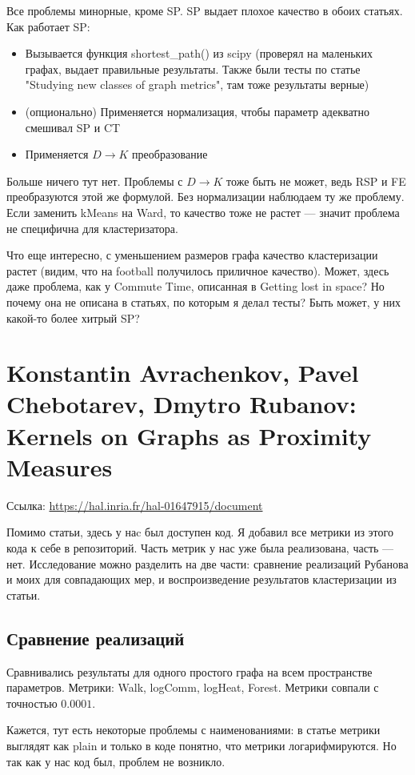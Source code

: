 \documentclass{article}
\begin{document}
Все проблемы минорные, кроме SP. SP выдает плохое качество в обоих статьях.
Как работает SP:
\begin{itemize}
  \item Вызывается функция shortest\_path() из scipy (проверял на маленьких графах, выдает правильные результаты. Также были тесты по статье "Studying new classes of graph metrics", там тоже результаты верные)
  \item (опционально) Применяется нормализация, чтобы параметр адекватно смешивал SP и CT
  \item Применяется $D \rightarrow K$ преобразование
\end{itemize}

Больше ничего тут нет. Проблемы с $D \rightarrow K$ тоже быть не может, ведь RSP и FE преобразуются этой же формулой. Без нормализации наблюдаем ту же проблему. Если заменить kMeans на Ward, то качество тоже не растет --- значит проблема не специфична для кластеризатора.

 Что еще интересно, с уменьшением размеров графа качество кластеризации растет (видим, что на football получилось приличное качество). Может, здесь даже проблема, как у Commute Time, описанная в Getting lost in space? Но почему она не описана в статьях, по которым я делал тесты? Быть может, у них какой-то более хитрый SP?


\section{Konstantin Avrachenkov, Pavel Chebotarev, Dmytro Rubanov:\\
         Kernels on Graphs as Proximity Measures}
Ссылка: \url{https://hal.inria.fr/hal-01647915/document}

Помимо статьи, здесь у наc был доступен код. Я добавил все метрики из этого кода к себе в репозиторий. Часть метрик у нас уже была реализована, часть --- нет.
Исследование можно разделить на две части: сравнение реализаций Рубанова и моих для совпадающих мер, и воспроизведение результатов кластеризации из статьи.

\subsection{Сравнение реализаций}
Сравнивались результаты для одного простого графа на всем пространстве параметров. Метрики: Walk, logComm, logHeat, Forest. Метрики совпали с точностью  $0.0001$.

Кажется, тут есть некоторые проблемы с наименованиями: в статье метрики выглядят как plain и только в коде понятно, что метрики логарифмируются. Но так как у нас код был, проблем не возникло.
\end{document}
